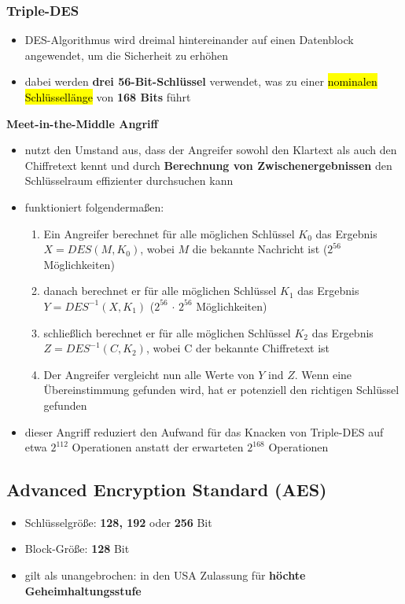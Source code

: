 \documentclass[a4paper, 10pt]{article}
\begin{document}
\subsubsection{Triple-DES}
\begin{itemize}
    \item DES-Algorithmus wird dreimal hintereinander auf einen Datenblock angewendet, um die Sicherheit zu erhöhen
    \item dabei werden \textbf{drei 56-Bit-Schlüssel} verwendet, was zu einer \hl{nominalen Schlüssellänge} von \textbf{168 Bits} führt
\end{itemize}
\textbf{Meet-in-the-Middle Angriff}
\begin{itemize}
    \item nutzt den Umstand aus, dass der Angreifer sowohl den Klartext als auch den Chiffretext kennt und durch \textbf{Berechnung von Zwischenergebnissen} den Schlüsselraum effizienter durchsuchen kann
    \item funktioniert folgendermaßen:
    \begin{enumerate}
        \item Ein Angreifer berechnet für alle möglichen Schlüssel $K_0$ das Ergebnis $X = DES(M, K_0)$, wobei $M$ die bekannte Nachricht ist ($2^{56}$ Möglichkeiten)
        \item danach berechnet er für alle möglichen Schlüssel $K_1$ das Ergebnis $Y= DES^{-1}(X,K_1)$ ($2^{56}$ $\cdot$ $2^{56}$ Möglichkeiten)
        \item schließlich berechnet er für alle möglichen Schlüssel $K_2$ das Ergebnis $Z = DES^{-1} (C, K_2)$, wobei C der bekannte Chiffretext ist
        \item Der Angreifer vergleicht nun alle Werte von $Y$ ind $Z$. Wenn eine Übereinstimmung gefunden wird, hat er potenziell den richtigen Schlüssel gefunden
    \end{enumerate}
    \item dieser Angriff reduziert den Aufwand für das Knacken von Triple-DES auf etwa $2^{112}$ Operationen anstatt der erwarteten $2^{168}$ Operationen
\end{itemize}

\subsection{Advanced Encryption Standard (AES)}
\begin{itemize}
    \item Schlüsselgröße: \textbf{128, 192} oder \textbf{256} Bit
    \item Block-Größe: \textbf{128} Bit
    \item gilt als unangebrochen: in den USA Zulassung für \textbf{höchte Geheimhaltungsstufe}
\end{itemize}
\end{document}
